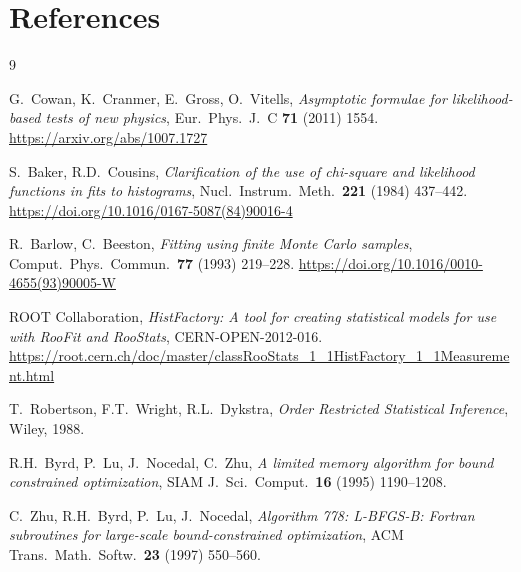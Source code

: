 \documentclass[12pt,a4paper]{article}
\begin{document}
\section*{References}
\begin{thebibliography}{9}

G.~Cowan, K.~Cranmer, E.~Gross, O.~Vitells,
\textit{Asymptotic formulae for likelihood-based tests of new physics},
Eur.\ Phys.\ J.\ C \textbf{71} (2011) 1554.
\url{https://arxiv.org/abs/1007.1727}

S.~Baker, R.D.~Cousins,
\textit{Clarification of the use of chi-square and likelihood functions in fits to histograms},
Nucl.\ Instrum.\ Meth.\ \textbf{221} (1984) 437--442.
\url{https://doi.org/10.1016/0167-5087(84)90016-4}

R.~Barlow, C.~Beeston,
\textit{Fitting using finite Monte Carlo samples},
Comput.\ Phys.\ Commun.\ \textbf{77} (1993) 219--228.
\url{https://doi.org/10.1016/0010-4655(93)90005-W}

ROOT Collaboration,
\textit{HistFactory: A tool for creating statistical models for use with RooFit and RooStats},
CERN-OPEN-2012-016.
\url{https://root.cern.ch/doc/master/classRooStats_1_1HistFactory_1_1Measurement.html}

T.~Robertson, F.T.~Wright, R.L.~Dykstra,
\textit{Order Restricted Statistical Inference},
Wiley, 1988.

R.H.~Byrd, P.~Lu, J.~Nocedal, C.~Zhu,
\textit{A limited memory algorithm for bound constrained optimization},
SIAM J.\ Sci.\ Comput.\ \textbf{16} (1995) 1190--1208.

C.~Zhu, R.H.~Byrd, P.~Lu, J.~Nocedal,
\textit{Algorithm 778: L-BFGS-B: Fortran subroutines for large-scale bound-constrained optimization},
ACM Trans.\ Math.\ Softw.\ \textbf{23} (1997) 550--560.

\end{thebibliography}
\end{document}
